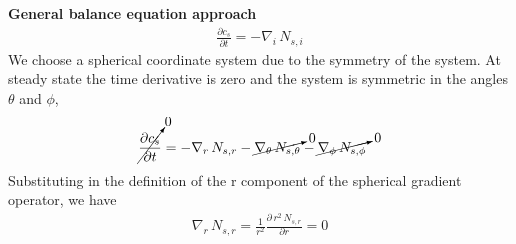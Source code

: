 \documentclass[calculator,datasheet,handbook]{exam}
\begin{document}
\begin{question}
\begin{enumerate}[a)]
\begin{enumerate}[i)]
{        {\bf General balance equation approach}
        \begin{align*}
          \frac{\partial c_s}{\partial t} = -\nabla_i\,N_{s,i}
        \end{align*}
        We choose a spherical coordinate system due to the symmetry of
        the system.  At steady state the time derivative is zero and
        the system is symmetric in the angles $\theta$ and $\phi$,
        \begin{align*}
          \cancelto{0}{\frac{\partial c_s}{\partial t}} &=
          -\nabla_r\,N_{s,r} - \cancelto{0}{\nabla_\theta\,N_{s,\theta}}
          - \cancelto{0}{\nabla_\phi\,N_{s,\phi}}
        \end{align*}
        Substituting in the definition of the r component of the
        spherical gradient operator, we have 
        \begin{align*}
          \nabla_r\,N_{s,r} = \frac{1}{r^2}\frac{\partial\,r^2\, N_{s,r}}{\partial r} = 0
        \end{align*}

}
\end{enumerate}
\end{enumerate}
\end{question}
\end{document}

